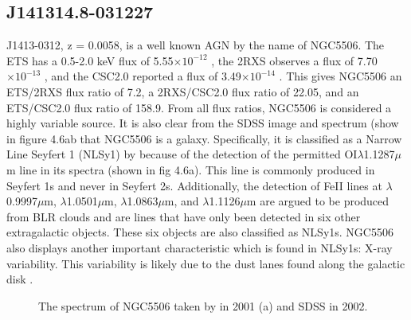 \subsection{ J141314.8-031227}


J1413-0312, z = 0.0058, is a well known AGN by the name of NGC5506.
The ETS has a 0.5-2.0 keV flux of 5.55$\times 10^{-12}$ \fluxunits, the 2RXS observes a flux of 7.70$\times 10^{-13}$ \fluxunits, and the CSC2.0 reported a flux of 3.49$\times 10^{-14}$ \fluxunits.
This gives NGC5506 an ETS/2RXS flux ratio of 7.2, a 2RXS/CSC2.0 flux ratio of 22.05, and an ETS/CSC2.0 flux ratio of 158.9.
From all flux ratios, NGC5506 is considered a highly variable source.
It is also clear from the SDSS image and spectrum (show in figure 4.6ab that NGC5506 is a galaxy.
Specifically, it is classified as a Narrow Line Seyfert 1 (NLSy1) by \cite{nagar2002} because of the detection of the permitted OI$\lambda$1.1287$\mu$m line in its spectra (shown in fig 4.6a). 
This line is commonly produced in Seyfert 1s and never in Seyfert 2s.
Additionally, the detection of FeII lines at $\lambda$0.9997$\mu$m, $\lambda$1.0501$\mu$m, $\lambda$1.0863$\mu$m, and $\lambda$1.1126$\mu$m are argued to be produced from BLR clouds and are lines that have only been detected in six other extragalactic objects.
These six objects are also classified as NLSy1s.
NGC5506 also displays another important characteristic which is found in NLSy1s: X-ray variability.
This variability is likely due to the dust lanes found along the galactic disk \citep{nagar2002}.


\begin{figure}[h]
    \centering
    \qquad
    \caption{The spectrum of NGC5506 taken by \cite{nagar2002} in 2001 (a) and SDSS in 2002. }%
    \label{fig:example}%
\end{figure}






